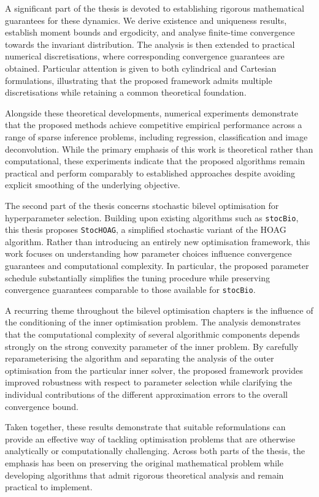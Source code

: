 \documentclass[11pt, twoside]{report}
\begin{document}
A significant part of the thesis is devoted to establishing rigorous mathematical guarantees for these dynamics. We derive existence and uniqueness results, establish moment bounds and ergodicity, and analyse finite-time convergence towards the invariant distribution. The analysis is then extended to practical numerical discretisations, where corresponding convergence guarantees are obtained. Particular attention is given to both cylindrical and Cartesian formulations, illustrating that the proposed framework admits multiple discretisations while retaining a common theoretical foundation.

Alongside these theoretical developments, numerical experiments demonstrate that the proposed methods achieve competitive empirical performance across a range of sparse inference problems, including regression, classification and image deconvolution. While the primary emphasis of this work is theoretical rather than computational, these experiments indicate that the proposed algorithms remain practical and perform comparably to established approaches despite avoiding explicit smoothing of the underlying objective.

The second part of the thesis concerns stochastic bilevel optimisation for hyperparameter selection. Building upon existing algorithms such as \texttt{stocBio}, this thesis proposes \texttt{StocHOAG}, a simplified stochastic variant of the HOAG algorithm. Rather than introducing an entirely new optimisation framework, this work focuses on understanding how parameter choices influence convergence guarantees and computational complexity. In particular, the proposed parameter schedule substantially simplifies the tuning procedure while preserving convergence guarantees comparable to those available for \texttt{stocBio}.

A recurring theme throughout the bilevel optimisation chapters is the influence of the conditioning of the inner optimisation problem. The analysis demonstrates that the computational complexity of several algorithmic components depends strongly on the strong convexity parameter of the inner problem. By carefully reparameterising the algorithm and separating the analysis of the outer optimisation from the particular inner solver, the proposed framework provides improved robustness with respect to parameter selection while clarifying the individual contributions of the different approximation errors to the overall convergence bound.

Taken together, these results demonstrate that suitable reformulations can provide an effective way of tackling optimisation problems that are otherwise analytically or computationally challenging. Across both parts of the thesis, the emphasis has been on preserving the original mathematical problem while developing algorithms that admit rigorous theoretical analysis and remain practical to implement.
\end{document}
